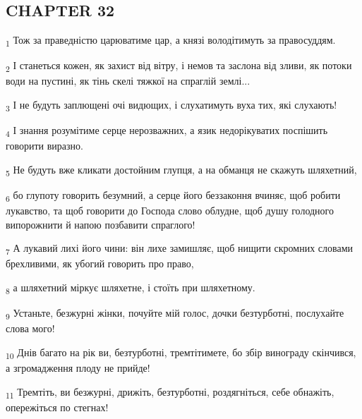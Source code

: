 \subsection{CHAPTER 32}
\begin{tcolorbox}
\textsubscript{1} Тож за праведністю царюватиме цар, а князі володітимуть за правосуддям.
\end{tcolorbox}
\begin{tcolorbox}
\textsubscript{2} І станеться кожен, як захист від вітру, і немов та заслона від зливи, як потоки води на пустині, як тінь скелі тяжкої на спраглій землі...
\end{tcolorbox}
\begin{tcolorbox}
\textsubscript{3} І не будуть заплющені очі видющих, і слухатимуть вуха тих, які слухають!
\end{tcolorbox}
\begin{tcolorbox}
\textsubscript{4} І знання розумітиме серце нерозважних, а язик недорікуватих поспішить говорити виразно.
\end{tcolorbox}
\begin{tcolorbox}
\textsubscript{5} Не будуть вже кликати достойним глупця, а на обманця не скажуть шляхетний,
\end{tcolorbox}
\begin{tcolorbox}
\textsubscript{6} бо глупоту говорить безумний, а серце його беззаконня вчиняє, щоб робити лукавство, та щоб говорити до Господа слово облудне, щоб душу голодного випорожнити й напою позбавити спраглого!
\end{tcolorbox}
\begin{tcolorbox}
\textsubscript{7} А лукавий лихі його чини: він лихе замишляє, щоб нищити скромних словами брехливими, як убогий говорить про право,
\end{tcolorbox}
\begin{tcolorbox}
\textsubscript{8} а шляхетний міркує шляхетне, і стоїть при шляхетному.
\end{tcolorbox}
\begin{tcolorbox}
\textsubscript{9} Устаньте, безжурні жінки, почуйте мій голос, дочки безтурботні, послухайте слова мого!
\end{tcolorbox}
\begin{tcolorbox}
\textsubscript{10} Днів багато на рік ви, безтурботні, тремтітимете, бо збір винограду скінчився, а згромадження плоду не прийде!
\end{tcolorbox}
\begin{tcolorbox}
\textsubscript{11} Тремтіть, ви безжурні, дрижіть, безтурботні, роздягніться, себе обнажіть, опережіться по стегнах!
\end{tcolorbox}
